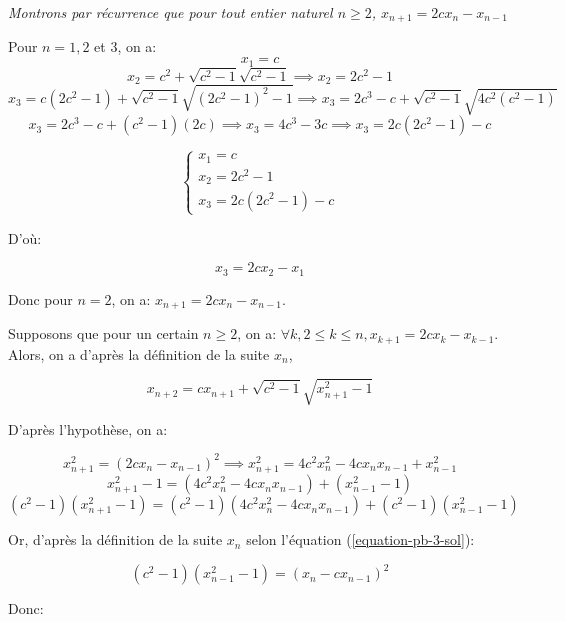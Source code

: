 \documentclass[12pt,a4paper,article]{memoir}
\begin{document}
\bigskip

\textit{Montrons par récurrence que pour tout entier naturel $n \geq 2$, $x_{n+1} = 2cx_{n} - x_{n-1}$}

\bigskip

Pour $n = 1, 2$ et $3$, on a:
\[x_{1} = c \]
\[x_{2} = c^2 + \sqrt{c^2 - 1}\sqrt{c^2 - 1} \implies x_{2} = 2c^2 - 1 \]
\[x_{3} = c(2c^2 - 1) + \sqrt{c^2 - 1}\sqrt{(2c^2 -  1)^2 - 1} \implies x_{3} = 2c^3 - c + \sqrt{c^2 - 1}\sqrt{4c^2(c^2 - 1)} \]
\[x_{3} = 2c^3 - c + (c^2 - 1)(2c) \implies x_{3} = 4c^3 - 3c \implies x_{3} = 2c(2c^2 - 1) - c \]

\begin{equation}
\left\{
	\begin{array}{l}
	x_{1} = c\\
	x_{2} = 2c^2 - 1\\
	x_{3} = 2c(2c^2 - 1) - c
	\end{array}
\right.
\label{equation-pb-3-sol-2-x1x2x3}
\end{equation}

D'où:

\begin{equation}
x_{3} = 2cx_{2} - x_{1}
\label{equation-pb-3-sol-2-x3fctx1x2}
\end{equation}

Donc pour $n=2$, on a: $x_{n+1} = 2cx_{n} - x_{n-1}$.

\bigskip

Supposons que pour un certain $n \geq 2$, on a: $\forall k, 2 \leq k \leq n, x_{k+1} = 2cx_{k} - x_{k-1}$. Alors, on a d'après la définition de la suite $x_{n}$,

\begin{equation}
x_{n+2} = cx_{n+1} + \sqrt{c^2 - 1}\sqrt{x_{n+1}^2 - 1}
\label{equation-pb-3-sol-2-xnplustwofctxnplusone}
\end{equation}

D'après l'hypothèse, on a:

\[x_{n+1}^2 = (2cx_{n} - x_{n-1})^2 \implies x_{n+1}^2 = 4c^{2}x_{n}^{2} - 4cx_{n}x_{n-1} + x_{n-1}^{2} \]
\[x_{n+1}^2 - 1 = (4c^{2}x_{n}^{2} - 4cx_{n}x_{n-1}) + (x_{n-1}^{2} - 1) \]
\[(c^2 - 1)(x_{n+1}^2 - 1) = (c^{2} - 1)(4c^{2}x_{n}^{2} - 4cx_{n}x_{n-1}) + (c^{2} - 1)(x_{n-1}^{2} - 1) \]

Or, d'après la définition de la suite $x_{n}$ selon l'équation (\ref{equation-pb-3-sol}):

\[(c^{2} - 1)(x_{n-1}^{2} - 1) = (x_{n} - cx_{n-1})^{2} \]

Donc:
\end{document}
